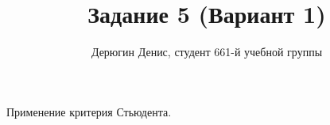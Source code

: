 \documentclass[20pt]{article}
\title{Задание 5 (Вариант 1)}
\author{
	Дерюгин Денис, студент 661-й учебной группы
}
\begin{document}
\large{
\maketitle

Применение критерия Стьюдента.



}

\end{document}
